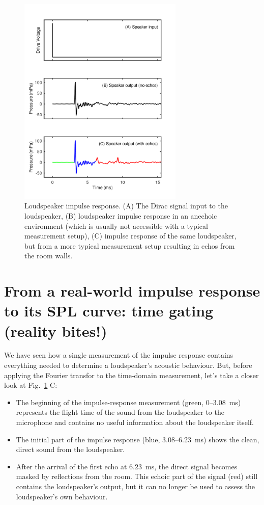 \documentclass[12pt,a4paper]{article}
\providecommand{\seclabel}[1]{\label{sec:#1}}
\providecommand{\figlabel}[1]{\label{fig:#1}}
\providecommand{\figr}[1]{Fig.~\ref{fig:#1}}
\begin{document}
\begin{figure}[tbp]
  \begin{center}
    \includegraphics[width=0.7\textwidth]{FIGURE1}
    \caption{Loudspeaker impulse response. (A) The Dirac signal input to the loudspeaker, (B) loudspeaker impulse response in an anechoic environment (which is usually not accessible with a typical measurement setup), (C) impulse response of the same loudspeaker, but from a more typical measurement setup resulting in echos from the room walls.}
    \figlabel{FIGURE1}
  \end{center}
\end{figure}

\section{From a real-world impulse response to its SPL curve: time gating (reality bites!)}\seclabel{from_IR_to_SPL}

We have seen how a single measurement of the impulse response contains everything needed to determine a loudspeaker’s acoustic behaviour.
But, before applying the Fourier transfor to the time-domain measurement, let's take a closer look at \mbox{\figr{FIGURE1}-C}:
\begin{itemize}
\item The beginning of the impulse-response measurement (green, 0--\SI{3.08}{ms}) represents the flight time of the sound from the loudspeaker to the microphone and contains no useful information about the loudspeaker itself.
\item The initial part of the impulse response (blue, 3.08--\SI{6.23}{ms}) shows the clean, direct sound from the loudspeaker.
\item After the arrival of the first echo at \SI{6.23}{ms}, the direct signal becomes masked by reflections from the room.
This echoic part of the signal (red) still contains the loudspeaker’s output, but it can no longer be used to assess the loudspeaker’s own behaviour.
\end{itemize}
\end{document}
